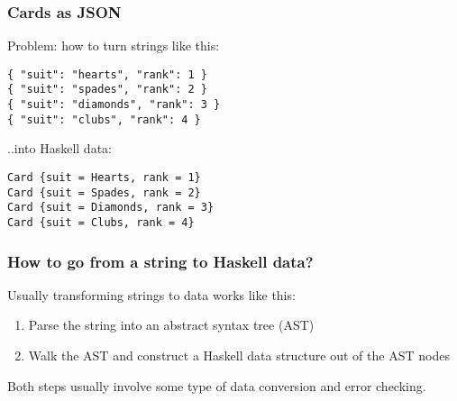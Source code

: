 \documentclass{beamer}
\begin{document}
\begin{frame}[fragile]
\frametitle{Cards as JSON}

Problem: how to turn strings like this:
\bigskip

{\small
\begin{verbatim}
{ "suit": "hearts", "rank": 1 }
{ "suit": "spades", "rank": 2 }
{ "suit": "diamonds", "rank": 3 }
{ "suit": "clubs", "rank": 4 }
\end{verbatim}
}
..into Haskell data:

{\small
\begin{verbatim}
Card {suit = Hearts, rank = 1}
Card {suit = Spades, rank = 2}
Card {suit = Diamonds, rank = 3}
Card {suit = Clubs, rank = 4}
\end{verbatim}
}

\end{frame}


\begin{frame}[fragile]
\frametitle{How to go from a string to Haskell data?}

Usually transforming strings to data works like this:
\begin{enumerate}
\item Parse the string into an abstract syntax tree (AST)
\item Walk the AST and construct a Haskell data structure out of the
  AST nodes
\end{enumerate}

Both steps usually involve some type of data conversion and error
checking.

\end{frame}

\end{document}
